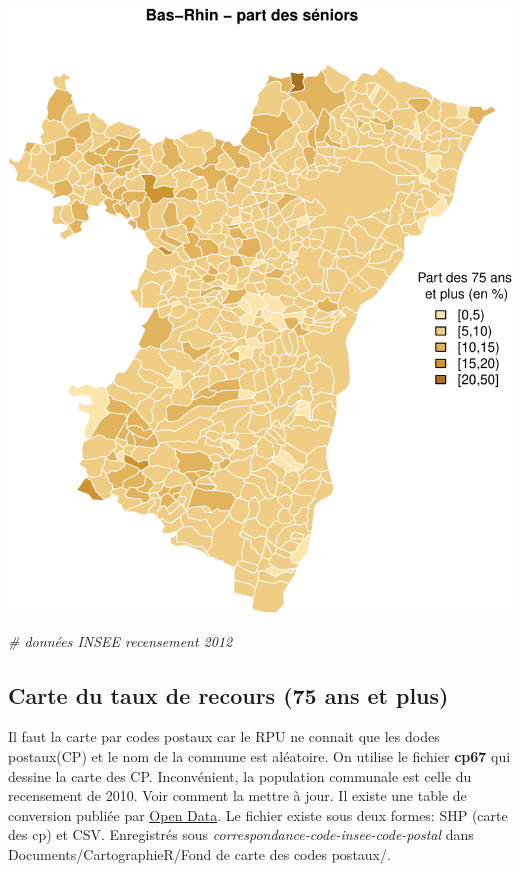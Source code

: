 \documentclass[]{article}
\newenvironment{Shaded}{\begin{snugshade}}{\end{snugshade}}
\newcommand{\CommentTok}[1]{\textcolor[rgb]{0.56,0.35,0.01}{\textit{{#1}}}}
\begin{document}
\includegraphics{insee_files/figure-latex/unnamed-chunk-3-1.pdf}

\begin{Shaded}
\begin{Highlighting}[]
\CommentTok{# données INSEE recensement 2012}
\end{Highlighting}
\end{Shaded}

\subsection{Carte du taux de recours (75 ans et
plus)}\label{carte-du-taux-de-recours-75-ans-et-plus}

Il faut la carte par codes postaux car le RPU ne connait que les dodes
postaux(CP) et le nom de la commune est aléatoire. On utilise le fichier
\textbf{cp67} qui dessine la carte des CP. Inconvénient, la population
communale est celle du recensement de 2010. Voir comment la mettre à
jour. Il existe une table de conversion publiée par
\href{http://public.opendatasoft.com/explore/dataset/correspondance-code-insee-code-postal/table/?tab=table}{Open
Data}. Le fichier existe sous deux formes: SHP (carte des cp) et CSV.
Enregistrés sous \emph{correspondance-code-insee-code-postal} dans
Documents/CartographieR/Fond de carte des codes postaux/.
\end{document}
